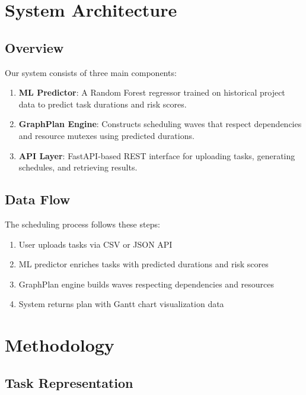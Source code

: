 \documentclass[11pt,a4paper]{article}
\begin{document}
\section{System Architecture}
\label{sec:architecture}

\subsection{Overview}

Our system consists of three main components:

\begin{enumerate}
    \item \textbf{ML Predictor}: A Random Forest regressor trained on historical project data to predict task durations and risk scores.
    
    \item \textbf{GraphPlan Engine}: Constructs scheduling waves that respect dependencies and resource mutexes using predicted durations.
    
    \item \textbf{API Layer}: FastAPI-based REST interface for uploading tasks, generating schedules, and retrieving results.
\end{enumerate}

\subsection{Data Flow}

The scheduling process follows these steps:

\begin{enumerate}
    \item User uploads tasks via CSV or JSON API
    \item ML predictor enriches tasks with predicted durations and risk scores
    \item GraphPlan engine builds waves respecting dependencies and resources
    \item System returns plan with Gantt chart visualization data
\end{enumerate}

\section{Methodology}
\label{sec:methodology}

\subsection{Task Representation}
\end{document}
